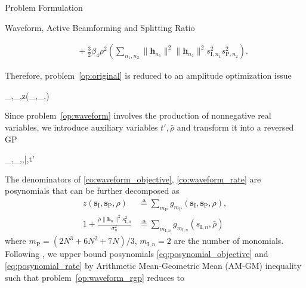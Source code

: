 \documentclass[journal]{IEEEtran}
\begin{document}
\begin{section}{Problem Formulation}
\begin{subsection}{Waveform, Active Beamforming and Splitting Ratio}
\begin{figure*}[b]
\begin{align}
					& \quad + \frac{3}{2}{\beta_4}{\rho^2} \left( \sum_{n_1,n_2} \lVert{\boldsymbol{h}_{n_1}}\rVert^2 \lVert{\boldsymbol{h}_{n_2}}\rVert^2 s_{\mathrm{I},{n_1}}^2 s_{\mathrm{P},{n_2}}^2 \right).\label{eq:z_waveform}
				\end{align}
			\end{figure*}%
			Therefore, problem~\eqref{op:original} is reduced to an amplitude optimization issue
			\begin{maxi!}
				{_{},_,\rho}{z(_{},_,\rho)}{\label{op:waveform}}{}
			\end{maxi!}
			Since problem~\eqref{op:waveform} involves the production of nonnegative real variables, we introduce auxiliary variables $t',\bar{\rho}$ and transform it into a reversed GP
			\begin{mini!}
				{_{},_,\rho,\bar{\rho},t'}{}{\label{op:waveform_rgp}}{}
				\label{co:waveform_power}
				\label{co:waveform_objective}
				\label{co:waveform_rate}
			\end{mini!}
			The denominators of \eqref{co:waveform_objective}, \eqref{co:waveform_rate} are posynomials \cite{Boyd2007} that can be further decomposed as
			\begin{align}
				z(\boldsymbol{s}_{\mathrm{I}},\boldsymbol{s}_\mathrm{P},\rho) &\triangleq \sum_{m_\mathrm{P}}{g_{m_\mathrm{P}}(\boldsymbol{s}_{\mathrm{I}},\boldsymbol{s}_\mathrm{P},\rho)}\label{eq:posynomial_objective},\\
				1+\frac{\bar{\rho}\lVert{\boldsymbol{h}_n}\rVert^2 s_{\mathrm{I},n}^2}{\sigma_n^2} &\triangleq \sum_{m_{\mathrm{I},n}}g_{m_{\mathrm{I},n}}(s_{\mathrm{I},n},\bar{\rho})\label{eq:posynomial_rate}
			\end{align}
			where $m_\mathrm{P}=(2N^3+6N^2+7N)/3$, $m_{\mathrm{I},n}=2$ are the number of monomials. Following \cite{Chiang2005}, we upper bound posynomials \eqref{eq:posynomial_objective} and \eqref{eq:posynomial_rate} by Arithmetic Mean-Geometric Mean (AM-GM) inequality such that problem~\eqref{op:waveform_rgp} reduces to

\end{subsection}
\end{section}
\end{document}
